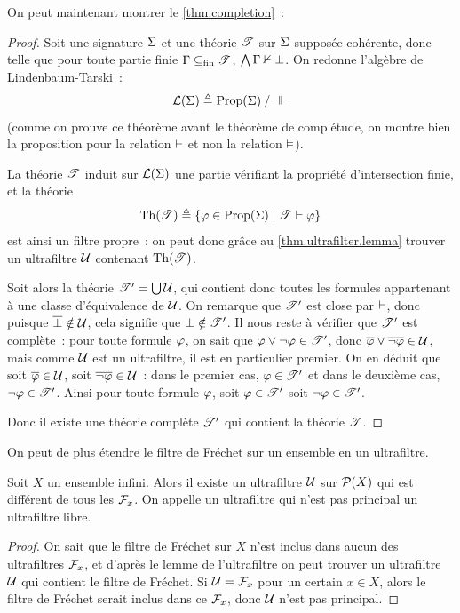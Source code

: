 On peut maintenant montrer le \cref{thm.completion}~:

\begin{proof}
  Soit une signature $\Sigma$ et une théorie $\mathscr T$ sur $\Sigma$ supposée
  cohérente, donc telle que pour toute partie finie $\Gamma\subseteq_{\mathrm{fin}} \mathscr T$,
  $\bigwedge \Gamma \nvdash \bot$. On redonne l'algèbre de Lindenbaum-Tarski~:
  \[\mathcal{L}(\Sigma) \triangleq \mathord{\operatorname{Prop}(\Sigma)}\mathbin{/}\mathord{\mathrel{\mathord{\dashv}\mathord{\vdash}}}\]
  (comme on prouve ce théorème avant le théorème de complétude, on montre bien
  la proposition pour la relation $\vdash$ et non la relation $\vDash$).

  La théorie $\mathscr T$ induit sur $\mathcal{L}(\Sigma)$ une partie vérifiant
  la propriété d'intersection finie, et la théorie
  \[\operatorname{Th}(\mathscr T) \triangleq \left\{ \varphi\in\operatorname{Prop}(\Sigma) \;\middle\vert\; \mathscr T \vdash \varphi \right\}\]
  est ainsi un filtre propre~: on peut donc grâce au
  \cref{thm.ultrafilter.lemma} trouver un ultrafiltre $\mathcal{U}$ contenant
  $\operatorname{Th}(\mathscr T)$.

  Soit alors la théorie $\mathscr T' = \bigcup\mathcal{U}$, qui contient donc
  toutes les formules appartenant à une classe d'équivalence de $\mathcal{U}$.
  On remarque que $\mathscr T'$ est close par $\vdash$, donc puisque
  $\overline{\bot} \notin\mathcal{U}$, cela signifie que $\bot\notin\mathscr T'$.
  Il nous reste à vérifier que $\mathscr T'$ est complète~: pour toute
  formule $\varphi$, on sait que $\varphi\lor\lnot\varphi \in \mathscr T'$, donc
  $\overline{\varphi}\lor\overline{\lnot\varphi}\in\mathcal{U}$, mais
  comme $\mathcal{U}$ est un ultrafiltre, il est en particulier premier. On
  en déduit que soit $\overline{\varphi} \in \mathcal{U}$, soit
  $\overline{\lnot\varphi}\in \mathcal{U}$~: dans le premier cas,
  $\varphi\in \mathscr T'$ et dans le deuxième cas,
  $\lnot\varphi\in \mathscr T'$. Ainsi pour toute formule $\varphi$, soit
  $\varphi\in \mathscr T'$ soit $\lnot\varphi\in \mathscr T'$.

  Donc il existe une théorie complète $\mathscr T'$ qui contient la théorie
  $\mathscr T$.
\end{proof}

\noindent
On peut de plus étendre le filtre de Fréchet sur un ensemble en un
ultrafiltre.

\begin{proposition}
  Soit $X$ un ensemble infini. Alors il existe un ultrafiltre $\mathcal{U}$ sur
  $\mathcal{P}(X)$ qui est différent de tous les $\mathcal{F}_{x}$. On appelle un
  ultrafiltre qui n'est pas principal un ultrafiltre libre.
\end{proposition}

\begin{proof}
  On sait que le filtre de Fréchet sur $X$ n'est inclus dans aucun des
  ultrafiltres $\mathcal{F}_{x}$, et d'après le lemme de l'ultrafiltre on peut
  trouver un ultrafiltre $\mathcal{U}$ qui contient le filtre de Fréchet. Si
  $\mathcal{U} = \mathcal{F}_{x}$ pour un certain $x\in X$, alors le filtre de
  Fréchet serait inclus dans ce $\mathcal{F}_{x}$, donc $\mathcal{U}$ n'est pas
  principal.
\end{proof}


